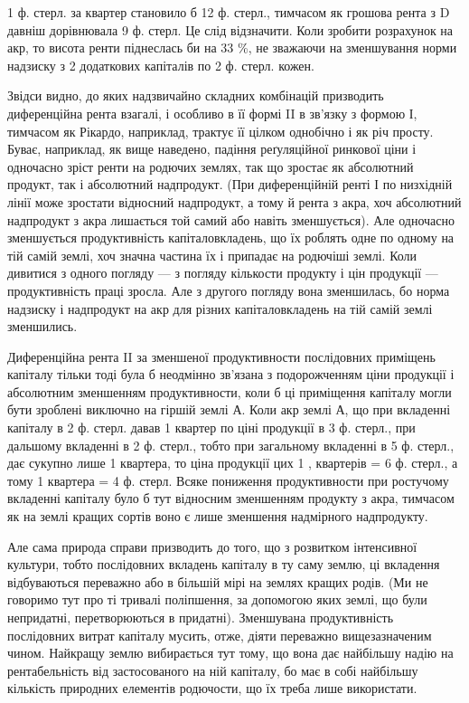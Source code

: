 \parcont{}  %
1  ф. стерл. за квартер становило б 12 ф. стерл., тимчасом як грошова рента
з D давніш дорівнювала 9 ф. стерл. Це слід відзначити. Коли зробити розрахунок
на акр, то висота ренти піднеслась би на 33 \%, не зважаючи на зменшування
норми надзиску з 2 додаткових капіталів по 2  ф. стерл. кожен.

Звідси видно, до яких надзвичайно складних комбінацій призводить диференційна
рента взагалі, і особливо в її формі II в зв’язку з формою І, тимчасом
як Рікардо, наприклад, трактує її цілком однобічно і як річ просту. Буває, наприклад,
як вище наведено, падіння реґуляційної ринкової ціни і одночасно зріст
ренти на родючих землях, так що зростає як абсолютний продукт, так і
абсолютний надпродукт. (При диференційній ренті І по низхідній лінії може
зростати відносний надпродукт, а тому й рента з акра, хоч абсолютний надпродукт
з акра лишається той самий або навіть зменшується). Але одночасно
зменшується продуктивність капіталовкладень, що їх роблять одне по одному
на тій самій землі, хоч значна частина їх і припадає на родючіші землі. Коли
дивитися з одного погляду — з погляду кількости продукту і цін продукції —
продуктивність праці зросла. Але з другого погляду вона зменшилась, бо норма
надзиску і надпродукт на акр для різних капіталовкладень на тій самій землі
зменшились.

Диференційна рента II за зменшеної продуктивности послідовних приміщень
капіталу тільки тоді була б неодмінно зв’язана з подорожченням ціни продукції
і абсолютним зменшенням продуктивности, коли б ці приміщення капіталу
могли бути зроблені виключно на гіршій землі А. Коли акр землі А, що
при вкладенні капіталу в 2  ф. стерл. давав 1 квартер по ціні продукції
в 3 ф. стерл., при дальшому вкладенні в 2  ф. стерл., тобто при загальному
вкладенні в 5 ф. стерл., дає сукупно лише 1  квартера, то ціна продукції цих
1 , квартерів = 6 ф. стерл., а тому 1 квартера = 4 ф. стерл. Всяке пониження
продуктивности при ростучому вкладенні капіталу було б тут відносним зменшенням
продукту з акра, тимчасом як на землі кращих сортів воно є лише
зменшення надмірного надпродукту.

Але сама природа справи призводить до того, що з розвитком інтенсивної
культури, тобто послідовних вкладень капіталу в ту саму землю, ці вкладення
відбуваються переважно або в більшій мірі на землях кращих родів. (Ми не говоримо
тут про ті тривалі поліпшення, за допомогою яких землі, що були непридатні,
перетворюються в придатні). Зменшувана продуктивність послідовних
витрат капіталу мусить, отже, діяти переважно вищезазначеним чином. Найкращу
землю вибирається тут тому, що вона дає найбільшу надію на рентабельність
від застосованого на ній капіталу, бо має в собі найбільшу кількість природних
елементів родючости, що їх треба лише використати.

